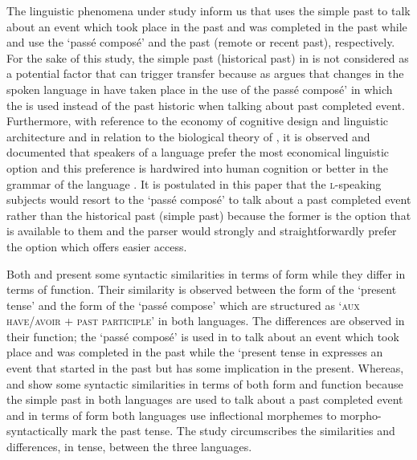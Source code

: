 \documentclass[output=paper,
modfonts
]{langscibook}
\begin{document}
The linguistic phenomena under study inform us that  uses the simple past to talk about an event which took place in the past and was completed in the past while  and  use the ‘passé composé’ and the past (remote or recent past), respectively. For the sake of this study, the simple past (historical past) in  is not considered as a potential factor that can trigger transfer because as \citet[26]{Rowlett2007} argues that changes in the spoken language in  have taken place in the use of the passé composé’ in which the  is used instead of the past historic when talking about past completed event. Furthermore, with reference to the economy of cognitive design and linguistic architecture \citep{FlynnEtAl2004,Rothman2010} and in relation to the biological theory of  \citep{Chomsky2007}, it is observed and documented that speakers of a language prefer the most economical linguistic option and this preference is hardwired into human cognition or better in the grammar of the language \citep[271]{Rothman2010}. It is postulated in this paper that the \textsc{l}-speaking  subjects would resort to the ‘passé composé’ to talk about a past completed event rather than the historical past (simple past) because the former is the option that is available to them and the parser would strongly and straightforwardly prefer the option which offers easier access. 

Both  and  present some syntactic similarities in terms of form while they differ in terms of function. Their similarity is observed between the form of the ‘present  tense’ and the form of the ‘passé compose’ which are structured as ‘\textsc{aux have/avoir + past participle}’ in both languages. The differences are observed in their function; the ‘passé composé’ is used in  to talk about an event which took place and was completed in the past while the ‘present  tense in  expresses an event that started in the past but has some implication in the present. Whereas,  and  show some syntactic similarities in terms of both form and function because the simple past in both languages are used to talk about a past completed event and in terms of form both languages use inflectional morphemes to morpho-syntactically mark the past tense. The study circumscribes the similarities and differences, in tense, between the three languages. 
\end{document}
